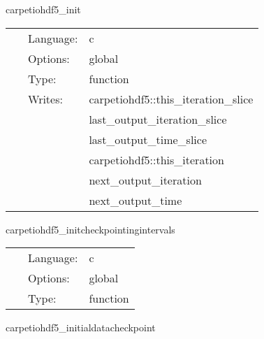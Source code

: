 \vspace{5mm}


\hspace{5mm} carpetiohdf5\_init 

\hspace{5mm}{\it initialisation routine } 


\hspace{5mm}

 \begin{tabular*}{160mm}{cll} 
~ & Language:  & c \\ 
~ & Options:  & global \\ 
~ & Type:  & function \\ 
~ & Writes:  & carpetiohdf5::this\_iteration\_slice \\ 
~& ~ &last\_output\_iteration\_slice\\ 
~& ~ &last\_output\_time\_slice\\ 
~& ~ &carpetiohdf5::this\_iteration\\ 
~& ~ &next\_output\_iteration\\ 
~& ~ &next\_output\_time\\ 
\end{tabular*} 


\vspace{5mm}


\hspace{5mm} carpetiohdf5\_initcheckpointingintervals 

\hspace{5mm}{\it initialisation of checkpointing intervals after recovery } 


\hspace{5mm}

 \begin{tabular*}{160mm}{cll} 
~ & Language:  & c \\ 
~ & Options:  & global \\ 
~ & Type:  & function \\ 
\end{tabular*} 


\vspace{5mm}


\hspace{5mm} carpetiohdf5\_initialdatacheckpoint 

\hspace{5mm}{\it initial data checkpoint routine } 


